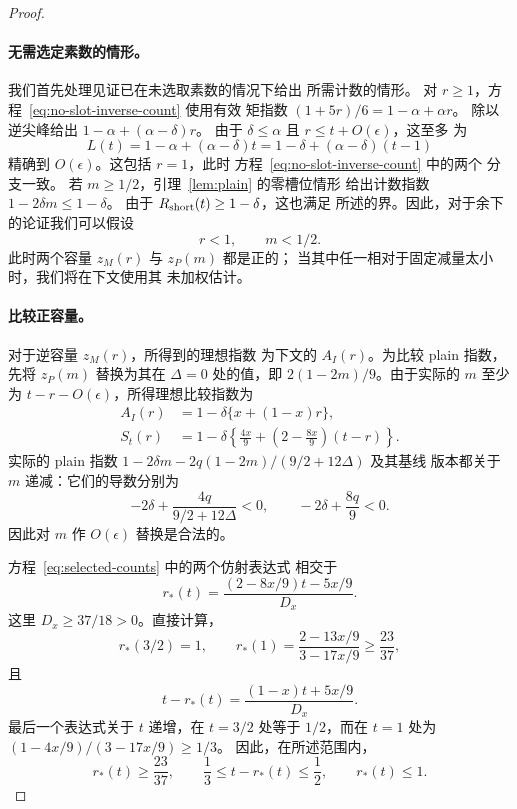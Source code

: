 \begin{proof}
\paragraph{无需选定素数的情形。}
我们首先处理见证已在未选取素数的情况下给出
所需计数的情形。
对 \(r\ge1\)，方程~\eqref{eq:no-slot-inverse-count} 使用有效
矩指数 \((1+5r)/6=1-\alpha+\alpha r\)。
除以逆尖峰给出
\(1-\alpha+(\alpha-\delta)r\)。
由于 \(\delta\le\alpha\) 且 \(r\le t+O(\epsilon)\)，这至多
为
\begin{equation}
 L(t)=1-\alpha+(\alpha-\delta)t
     =1-\delta+(\alpha-\delta)(t-1)
 \label{eq:long-count}
\end{equation}
精确到 \(O(\epsilon)\)。这包括 \(r=1\)，此时
方程~\eqref{eq:no-slot-inverse-count} 中的两个
分支一致。
若 \(m\ge1/2\)，引理~\ref{lem:plain} 的零槽位情形
给出计数指数 \(1-2\delta m\le1-\delta\)。
由于 \(R_{\rm short}(t)\ge1-\delta\)，这也满足
所述的界。因此，对于余下的论证我们可以假设
\[
 r<1,\qquad m<1/2.
\]
此时两个容量 \(z_M(r)\) 与 \(z_P(m)\) 都是正的；
当其中任一相对于固定减量太小时，我们将在下文使用其
未加权估计。

\paragraph{比较正容量。}
对于逆容量 \(z_M(r)\)，所得到的理想指数
为下文的 \(A_I(r)\)。为比较 plain 指数，先将
\(z_P(m)\) 替换为其在 \(\Delta=0\) 处的值，即
\(2(1-2m)/9\)。由于实际的 \(m\) 至少为
\(t-r-O(\epsilon)\)，所得理想比较指数为
\begin{equation}
 \begin{aligned}
 A_I(r)&=1-\delta\{x+(1-x)r\},\\
 S_t(r)&=1-\delta\left\{\frac{4x}{9}
          +\left(2-\frac{8x}{9}\right)(t-r)\right\}.
 \end{aligned}
 \label{eq:selected-counts}
\end{equation}
实际的 plain 指数
\(1-2\delta m-2q(1-2m)/(9/2+12\Delta)\) 及其基线
版本都关于 \(m\) 递减：它们的导数分别为
\[
 -2\delta+\frac{4q}{9/2+12\Delta}<0,\qquad
 -2\delta+\frac{8q}{9}<0.
\]
因此对 \(m\) 作 \(O(\epsilon)\) 替换是合法的。

方程~\eqref{eq:selected-counts} 中的两个仿射表达式
相交于
\[
 r_*(t)=
 \frac{(2-8x/9)t-5x/9}{D_x}.
\]
这里 \(D_x\ge37/18>0\)。直接计算，
\[
 r_*(3/2)=1,\qquad
 r_*(1)=\frac{2-13x/9}{3-17x/9}\ge\frac{23}{37},
\]
且
\[
 t-r_*(t)=\frac{(1-x)t+5x/9}{D_x}.
\]
最后一个表达式关于 \(t\) 递增，在
\(t=3/2\) 处等于 \(1/2\)，而在 \(t=1\) 处为
\((1-4x/9)/(3-17x/9)\ge1/3\)。
因此，在所述范围内，
\[
 r_*(t)\ge\frac{23}{37},\qquad
 \frac13\le t-r_*(t)\le\frac12,\qquad r_*(t)\le1.
\]


\end{proof}
